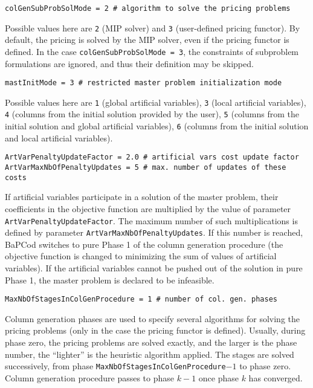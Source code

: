 \documentclass[10pt,a4paper]{article}
\newcommand{\bc}{BaPCod\xspace}
\begin{document}
\begin{lstlisting}
colGenSubProbSolMode = 2 # algorithm to solve the pricing problems
\end{lstlisting}
Possible values here are \verb+2+ (MIP solver) and \verb+3+ (user-defined pricing functor). By default, the pricing is
solved by the MIP solver, even if the pricing functor is defined. In the case \verb+colGenSubProbSolMode = 3+, the
constraints of subproblem formulations are ignored, and thus their definition may be skipped.

\begin{lstlisting}
mastInitMode = 3 # restricted master problem initialization mode
\end{lstlisting}
Possible values here are \verb+1+ (global artificial variables), \verb+3+ (local artificial variables), \verb+4+
(columns from the initial solution provided by the user), \verb+5+ (columns from the initial solution and global
artificial variables), \verb+6+ (columns from the initial solution and local artificial variables).  

\begin{lstlisting}
ArtVarPenaltyUpdateFactor = 2.0 # artificial vars cost update factor
ArtVarMaxNbOfPenaltyUpdates = 5 # max. number of updates of these costs
\end{lstlisting}
If artificial variables participate in a solution of the master problem, their coefficients in the objective
function are multiplied by the value of parameter \verb+ArtVarPenaltyUpdateFactor+. The maximum number of such
multiplications is defined by parameter \verb+ArtVarMaxNbOfPenaltyUpdates+. If this number is reached, \bc switches to
pure Phase 1 of the column generation procedure (the objective function is changed to minimizing the sum of values of
artificial variables). If the artificial variables cannot be pushed out of the solution in pure Phase 1, the master
problem is declared to be infeasible.

\begin{lstlisting}
MaxNbOfStagesInColGenProcedure = 1 # number of col. gen. phases 
\end{lstlisting}
Column generation phases are used to specify several algorithms for solving the pricing problems (only in the case the
pricing functor is defined). Usually, during phase zero, the pricing problems are solved exactly, and the larger is the
phase number, the ``lighter'' is the heuristic algorithm applied. The stages are solved successively, from phase
\verb+MaxNbOfStagesInColGenProcedure+$-1$ to phase zero. Column generation procedure passes to phase $k-1$ once phase
$k$ has converged.
\end{document}
